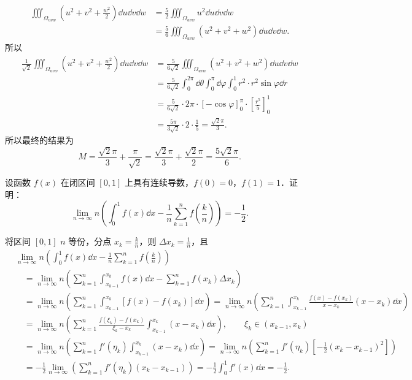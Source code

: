 \begin{solution}
\[  \]
  \begin{align*}
    \iiint_{\Omega_{uvw}}\left(u^2+v^2+\frac{w^2}{2}\right)\dd u\dd v\dd w
    &=\frac{5}{2}\iiint_{\Omega_{uvw}}u^2\dd u\dd v\dd w\\
    &=\frac{5}{6}\iiint_{\Omega_{uvw}}\left(u^2+v^2+w^2\right)\dd u\dd v\dd w.
  \end{align*}
  所以
  \begin{align*}
    \frac{1}{\sqrt{2}}\iiint_{\Omega_{uvw}}\left(u^2+v^2+\frac{w^2}{2}\right)\dd u\dd v\dd w
    &=\frac{5}{6\sqrt{2}}\iiint_{\Omega_{uvw}}\left(u^2+v^2+w^2\right)\dd u\dd v\dd w\\
    &=\frac{5}{6\sqrt{2}}\int_0^{2\pi}\dd\theta\int_0^{\pi}\dd\varphi\int_0^1 r^2\cdot r^2\sin\varphi\dd r\\
    &=\frac{5}{6\sqrt{2}}\cdot 2\pi\cdot\left[-\cos\varphi\right]_0^{\pi}\cdot\left[\frac{r^5}{5}\right]_0^1\\
    &=\frac{5\pi}{3\sqrt{2}}\cdot 2\cdot\frac{1}{5}=\frac{\sqrt{2}\pi}{3}.
  \end{align*}
  所以最终的结果为
  \[
    M=\frac{\sqrt{2}\pi}{3}+\frac{\pi}{\sqrt{2}}=\frac{\sqrt{2}\pi}{3}+\frac{\sqrt{2}\pi}{2}=\frac{5\sqrt{2}\pi}{6}.
  \]
\end{solution}

设函数 $f(x)$ 在闭区间 $[0,1]$ 上具有连续导数，$f(0)=0$，$f(1)=1$．证明：
\[
  \lim_{n\to\infty}n\left(\int_0^1 f(x)\dd x-\frac{1}{n}\sum_{k=1}^n f\left(\frac{k}{n}\right)\right)=-\frac{1}{2}.
\]
\begin{solution}
  将区间 $[0,1]$ $n$ 等份，分点 $x_k=\frac{k}{n}$，则 $\Delta x_k=\frac{1}{n}$，且
  \begin{align*}
    &\lim_{n\to\infty}n\left(\int_0^1 f(x)\dd x-\frac{1}{n}\sum_{k=1}^n f\left(\frac{k}{n}\right)\right)\\
    &\quad=\lim_{n\to\infty}n\left(\sum_{k=1}^n\int_{x_{k-1}}^{x_k}f(x)\dd x-\sum_{k=1}^n f(x_k)\Delta x_k\right)\\
    &\quad=\lim_{n\to\infty}n\left(\sum_{k=1}^n\int_{x_{k-1}}^{x_k}\left[f(x)-f(x_k)\right]\dd x\right)
     =\lim_{n\to\infty}n\left(\sum_{k=1}^n\int_{x_{k-1}}^{x_k}\frac{f(x)-f(x_k)}{x-x_k}(x-x_k)\dd x\right)\\
    &\quad=\lim_{n\to\infty}n\left(\sum_{k=1}^n\frac{f(\xi_k)-f(x_k)}{\xi_k-x_k}\int_{x_{k-1}}^{x_k}(x-x_k)\dd x\right),\qquad \xi_k\in(x_{k-1},x_k)\\
    &\quad=\lim_{n\to\infty}n\left(\sum_{k=1}^n f'(\eta_k)\int_{x_{k-1}}^{x_k}(x-x_k)\dd x\right)
     =\lim_{n\to\infty}n\left(\sum_{k=1}^n f'(\eta_k)\left[-\frac{1}{2}(x_k-x_{k-1})^2\right]\right)\\
    &\quad=-\frac{1}{2}\lim_{n\to\infty}\left(\sum_{k=1}^n f'(\eta_k)(x_k-x_{k-1})\right)
     =-\frac{1}{2}\int_0^1 f'(x)\dd x=-\frac{1}{2}.
  \end{align*}
\end{solution}

